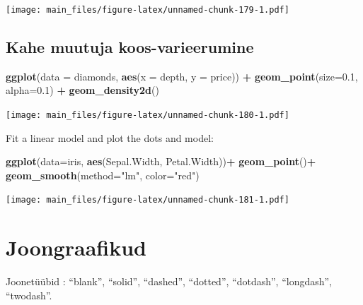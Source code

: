 \documentclass[]{book}
\newenvironment{Shaded}{\begin{snugshade}}{\end{snugshade}}
\newcommand{\KeywordTok}[1]{\textcolor[rgb]{0.13,0.29,0.53}{\textbf{#1}}}
\newcommand{\DataTypeTok}[1]{\textcolor[rgb]{0.13,0.29,0.53}{#1}}
\newcommand{\FloatTok}[1]{\textcolor[rgb]{0.00,0.00,0.81}{#1}}
\newcommand{\StringTok}[1]{\textcolor[rgb]{0.31,0.60,0.02}{#1}}
\newcommand{\OperatorTok}[1]{\textcolor[rgb]{0.81,0.36,0.00}{\textbf{#1}}}
\newcommand{\NormalTok}[1]{#1}
\begin{document}
\texttt{[image: main\_files/figure-latex/unnamed-chunk-179-1.pdf]}

\subsection{Kahe muutuja
koos-varieerumine}\label{kahe-muutuja-koos-varieerumine}

\begin{Shaded}
\begin{Highlighting}[]
\KeywordTok{ggplot}\NormalTok{(}\DataTypeTok{data =}\NormalTok{ diamonds, }\KeywordTok{aes}\NormalTok{(}\DataTypeTok{x =}\NormalTok{ depth, }\DataTypeTok{y =}\NormalTok{ price)) }\OperatorTok{+}
\StringTok{  }\KeywordTok{geom_point}\NormalTok{(}\DataTypeTok{size=}\FloatTok{0.1}\NormalTok{, }\DataTypeTok{alpha=}\FloatTok{0.1}\NormalTok{) }\OperatorTok{+}
\StringTok{  }\KeywordTok{geom_density2d}\NormalTok{()}
\end{Highlighting}
\end{Shaded}

\texttt{[image: main\_files/figure-latex/unnamed-chunk-180-1.pdf]}

Fit a linear model and plot the dots and model:

\begin{Shaded}
\begin{Highlighting}[]
\KeywordTok{ggplot}\NormalTok{(}\DataTypeTok{data=}\NormalTok{iris, }\KeywordTok{aes}\NormalTok{(Sepal.Width, Petal.Width))}\OperatorTok{+}
\StringTok{  }\KeywordTok{geom_point}\NormalTok{()}\OperatorTok{+}
\StringTok{  }\KeywordTok{geom_smooth}\NormalTok{(}\DataTypeTok{method=}\StringTok{"lm"}\NormalTok{, }\DataTypeTok{color=}\StringTok{"red"}\NormalTok{) }
\end{Highlighting}
\end{Shaded}

\texttt{[image: main\_files/figure-latex/unnamed-chunk-181-1.pdf]}

\section{Joongraafikud}\label{joongraafikud}

Joonetüübid : ``blank'', ``solid'', ``dashed'', ``dotted'', ``dotdash'',
``longdash'', ``twodash''.
\end{document}
